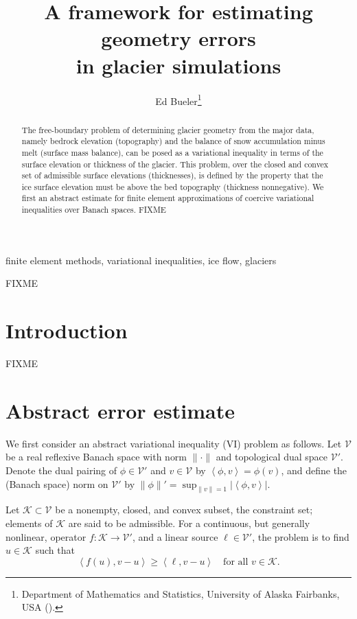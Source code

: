 \documentclass[hidelinks,onefignum,onetabnum,final]{siamart220329}  %
\title{A framework for estimating geometry errors \\ in glacier simulations}
\author{Ed Bueler\thanks{Department of Mathematics and Statistics, University of Alaska Fairbanks, USA
  (\email{elbueler@alaska.edu}).}}
\newcommand{\cK}{\mathcal{K}}
\newcommand{\cV}{\mathcal{V}}
\newcommand{\ip}[2]{\left<#1,#2\right>}
\begin{document}
\maketitle

\begin{abstract}
The free-boundary problem of determining glacier geometry from the major data, namely bedrock elevation (topography) and the balance of snow accumulation minus melt (surface mass balance), can be posed as a variational inequality in terms of the surface elevation or thickness of the glacier.  This problem, over the closed and convex set of admissible surface elevations (thicknesses), is defined by the property that the ice surface elevation must be above the bed topography (thickness nonnegative).  We first an abstract estimate for finite element approximations of coercive variational inequalities over Banach spaces.  FIXME
\end{abstract}

\begin{keywords}
finite element methods, variational inequalities, ice flow, glaciers
\end{keywords}

\begin{MSCcodes}
FIXME
\end{MSCcodes}


\section{Introduction} \label{sec:intro}

FIXME


\section{Abstract error estimate} \label{sec:abstractestimate}

We first consider an abstract variational inequality (VI) problem as follows.  Let $\cV$ be a real reflexive Banach space with norm $\|\cdot\|$ and topological dual space $\cV'$.  Denote the dual pairing of $\phi \in \cV'$ and $v\in\cV$ by $\ip{\phi}{v} = \phi(v)$, and define the (Banach space) norm on $\cV'$ by $\|\phi\|' = \sup_{\|v\|=1} |\!\ip{\phi}{v}\!|$.

Let $\cK \subset \cV$ be a nonempty, closed, and convex subset, the constraint set; elements of $\cK$ are said to be admissible.  For a continuous, but generally nonlinear, operator $f:\cK \to \cV'$, and a linear source $\ell\in \cV'$, the problem is to find $u\in \cK$ such that
\begin{equation}
\ip{f(u)}{v-u} \ge \ip{\ell}{v-u} \quad \text{for all } v\in \cK. \label{eq:vi}
\end{equation}
\end{document}
